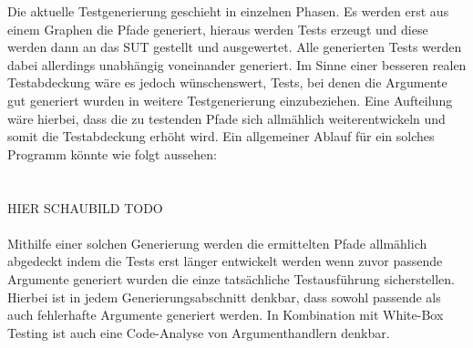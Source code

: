 Die aktuelle Testgenerierung geschieht in einzelnen Phasen.
Es werden erst aus einem Graphen die Pfade generiert, hieraus werden Tests erzeugt und diese werden dann an das SUT gestellt und ausgewertet.
Alle generierten Tests werden dabei allerdings unabhängig voneinander generiert.
Im Sinne einer besseren realen Testabdeckung  wäre es jedoch wünschenswert, Tests, bei denen die Argumente gut generiert wurden in weitere Testgenerierung einzubeziehen.
Eine Aufteilung wäre hierbei, dass die zu testenden Pfade sich allmählich weiterentwickeln und somit die Testabdeckung erhöht wird.
Ein allgemeiner Ablauf für ein solches Programm könnte wie folgt aussehen: \\
\\
\\
HIER SCHAUBILD TODO
\\
\\
Mithilfe einer solchen Generierung werden die ermittelten Pfade allmählich abgedeckt indem die Tests erst länger entwickelt werden
wenn zuvor passende Argumente generiert wurden die einze tatsächliche Testausführung sicherstellen.
Hierbei ist in jedem Generierungsabschnitt denkbar, dass sowohl passende als auch fehlerhafte Argumente generiert werden.
In Kombination mit White-Box Testing ist auch eine Code-Analyse von Argumenthandlern denkbar.
